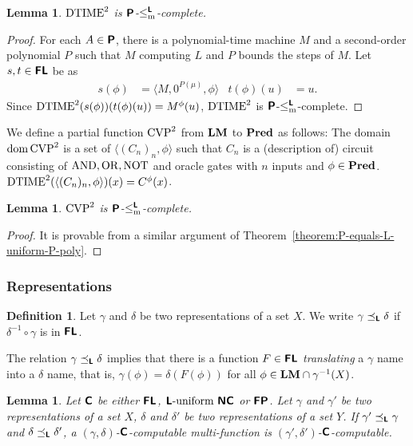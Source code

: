 \documentclass{article}
\newtheorem{lemma}[theorem]{Lemma}
\theoremstyle{definition}
\newtheorem{definition}[theorem]{Definition}
\theoremstyle{remark}
\begin{document}
\begin{lemma}
 $\mathrm{DTIME}^2$ is $\text{\bfseries \sffamily \upshape P}$-$\leq _{\mathrm{m}} ^{\text{\bfseries \sffamily \upshape L}}$-complete.
\end{lemma}

\begin{proof}
 For each $A \in \text{\bfseries \sffamily \upshape P}$, there is a polynomial-time machine $M$ and a second-order polynomial $P$ such that $M$ computing $L$ and $P$ bounds the steps of $M$.
 Let $s, t \in \text{\bfseries \sffamily \upshape FL}$ be as
 \begin{align}
  s(\phi) &= \langle M, 0^{P(\mu)}, \phi \rangle
  &
  t(\phi)(u) &= u.
 \end{align}
 Since  $\mathrm{DTIME}^2(s(\phi))(t(\phi)(u)) = M^\phi (u)$,
 $\mathrm{DTIME}^2$ is $\text{\bfseries \sffamily \upshape P}$-$\leq _{\mathrm{m}} ^{\text{\bfseries \sffamily \upshape L}}$-complete.
\end{proof}


We define a partial function  $\mathrm{CVP}^2$ from $\mathbf{LM}$ to $\mathbf{Pred}$ as follows:
The domain $\mathop{\rm dom} \mathrm{CVP}^2$ is a set of $\langle (C_n)_n, \phi \rangle$
such that $C_n$ is a (description of) circuit consisting of $\mathrm{AND}, \mathrm{OR}, \mathrm{NOT}$
and oracle gates with $n$ inputs and $\phi \in \mathbf{Pred}$.
$\mathrm{DTIME}^2(\langle (C_n)_n,  \phi \rangle)(x) = C^\phi(x)$.

\begin{lemma}
 $\mathrm{CVP}^2$ is $\text{\bfseries \sffamily \upshape P}$-$\leq _{\mathrm{m}} ^{\text{\bfseries \sffamily \upshape L}}$-complete.
\end{lemma}

\begin{proof}
 It is provable from a similar argument of Theorem~\ref{theorem:P-equals-L-uniform-P-poly}.
\end{proof}



\subsubsection{Representations}
\newcommand{\transL}{\preceq_\classLtwo}



\begin{definition}
Let $\gamma$ and $\delta$ be two representations of a set $X$.
We write $\gamma \transL \delta$ if
$\delta^{-1} \circ \gamma$ is in $\text{\bfseries \sffamily \upshape FL}$.
\end{definition}
The relation $\gamma \transL \delta$ implies that
there is a function $F \in \text{\bfseries \sffamily \upshape FL}$ \emph{translating} a $\gamma$ name
into a $\delta$ name, that is, $\gamma(\phi) = \delta(F(\phi))$ 
for all $\phi \in \mathbf{LM} \cap \gamma^{-1}(X)$.

\begin{lemma}
 Let $\text{\bfseries \sffamily \upshape C}$ be either $\text{\bfseries \sffamily \upshape FL}$, $\text{\bfseries \sffamily \upshape L}\text{-uniform}\ \text{\bfseries \sffamily \upshape NC}$ or
 $\text{\bfseries \sffamily \upshape FP}$.
 Let $\gamma$ and $\gamma'$ be two representations of a set $X$, 
 $\delta$ and $\delta'$ be two representations of a set $Y$.
 If $\gamma' \transL \gamma$ and $\delta \transL \delta'$,
 a $(\gamma, \delta)$-$\text{\bfseries \sffamily \upshape C}$-computable multi-function is
 $(\gamma', \delta')$-$\text{\bfseries \sffamily \upshape C}$-computable.
\end{lemma}
\end{document}
